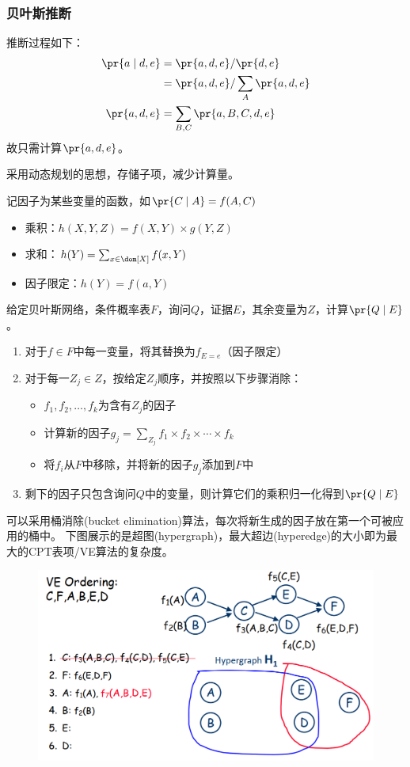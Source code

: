 \subsubsection{贝叶斯推断}
推断过程如下：
\[\begin{aligned}
\pr{a\mid d,e}&=\pr{a,d,e}/\pr{d,e}\\
&=\pr{a,d,e}/\sum_{A}\pr{a,d,e}\\
\pr{a,d,e}&=\sum_{B,C}\pr{a,B,C,d,e}
\end{aligned}\]
故只需计算$\pr{a,d,e}$。

采用动态规划的思想，存储子项，减少计算量。

记因子为某些变量的函数，如$\pr{C\mid A}=f(A,C)$
\begin{itemize}
	\item 乘积：$h(X,Y,Z)=f(X,Y)\times g(Y,Z)$
	\item 求和：$h(Y)=\sum_{x\in\dom[X]}f(x,Y)$
	\item 因子限定：$h(Y)=f(a,Y)$
\end{itemize}

\begin{myalgorithm}
给定贝叶斯网络，条件概率表$F$，询问$Q$，证据$E$，其余变量为$Z$，计算$\pr{Q\mid E}$。
\begin{enumerate}
	\item 对于$f\in F$中每一变量，将其替换为$f_{E=e}$（因子限定）
	\item 对于每一$Z_j\in Z$，按给定$Z_j$顺序，并按照以下步骤消除：
	\begin{itemize}
		\item $f_1,f_2,\ldots,f_k$为含有$Z_j$的因子
		\item 计算新的因子$g_j=\sum_{Z_j}f_1\times f_2\times\cdots\times f_k$
		\item 将$f_i$从$F$中移除，并将新的因子$g_j$添加到$F$中
	\end{itemize}
	\item 剩下的因子只包含询问$Q$中的变量，则计算它们的乘积归一化得到$\pr{Q\mid E}$
\end{enumerate}
\end{myalgorithm}

可以采用桶消除(bucket elimination)算法，每次将新生成的因子放在第一个可被应用的桶中。
下图展示的是超图(hypergraph)，最大超边(hyperedge)的大小即为最大的CPT表项/VE算法的复杂度。
\begin{figure}[H]
\centering
\includegraphics[width=0.8\linewidth]{fig/bucket_elimination.png}
\end{figure}

